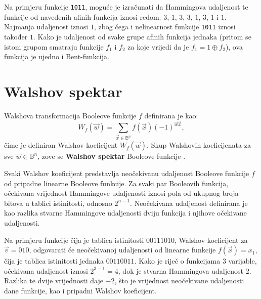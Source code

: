 Na primjeru funkcije \texttt{1011}, moguće je izračunati da Hammingova udaljenost te funkcije od navedenih afinih funkcija iznosi redom: $3$, $1$, $3$, $3$, $1$, $3$, $1$ i $1$.
Najmanja udaljenost iznosi $1$, zbog čega i nelinearnost funkcije \texttt{1011} iznosi također $1$.
Kako je udaljenost od svake grupe afinih funkcija jednaka (pritom se istom grupom smatraju funkcije $f_1$ i $f_2$ za koje vrijedi da je $f_1 = 1 \oplus f_2$), ova funkcija je ujedno i Bent-funkcija.

\section {Walshov spektar}
Walshova transformacija Booleove funkcije $f$ definirana je kao:
\begin{equation}\label{eq:walsh transform}
    W_f(\vec{w}) = \sum_{\vec{x} \in \mathds{B}^n}f(\vec{x})(-1)^{\vec{w}\vec{x}},
\end{equation}
čime je definiran Walshov koeficijent $W_f(\vec{w})$.
Skup Walshovih koeficijenata za sve $\vec{w} \in \mathds{B}^n$, zove se \textbf{Walshov spektar} Booleove funkcije \cite{CryptographicBooleanFunctions}.

Svaki Walshov koeficijent predstavlja neočekivanu udaljenost  \cite{MeasuringBoolean} Booleove funkcije $f$ od pripadne linearne Booleove funkcije.
Za svaki par Booleovih funkcija, očekivana vrijednost Hammingove udaljenosti iznosi pola od ukupnog broja bitova u tablici istinitosti, odnosno $2^{n-1}$.
Neočekivana udaljenost definirana je kao razlika stvarne Hammingove udaljenosti dviju funkcija i njihove očekivane udaljenosti.

Na primjeru funkcije čija je tablica istinitosti $00111010$, Walshov koeficijent za $\vec{v} = 010$, odgovarati će neočekivanoj udaljenosti od linearne funkcije $f(\vec{x}) = x_1$, čija je tablica istinitosti jednaka $00110011$.
Kako je riječ o funkcijama $3$ varijable, očekivana udaljenost iznosi $2^{3-1} = 4$, dok je stvarna Hammingova udaljenost $2$.
Razlika te dvije vrijednosti daje $-2$, što je vrijednost neočekivane udaljenosti dane funkcije, kao i pripadni Walshov koeficijent.

